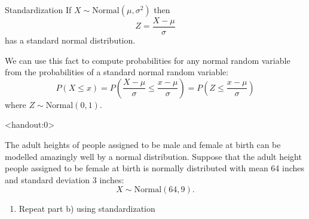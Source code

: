 \begin{frame}
  \begin{block}{Standardization}
    If $X \sim \mbox{Normal}(\mu,\sigma^2)$ then
    \[
      Z=\frac{X-\mu}{\sigma}
    \]
    has a standard normal distribution.

    \bigskip

    \pause
    
    We can use this fact to compute probabilities for any normal random variable from the probabilities of a standard normal random variable:
    \[
      P(X \leq x)
      =P\left(\frac{X-\mu}{\sigma} \leq \frac{x-\mu}{\sigma}\right)
      =P\left(Z \leq \frac{x-\mu}{\sigma}\right)
    \]
    where $Z \sim \mbox{Normal}(0,1)$. 
  \end{block}
\end{frame}

\begin{frame}<handout:0>
  \begin{block}{\examplectd}
    The adult heights of people assigned to be male and female at birth can be modelled amazingly well by a normal distribution. Suppose that the adult height people assigned to be female at birth is normally distributed with mean 64 inches and standard deviation 3 inches:
    \[
      X \sim \mbox{Normal}(64,9).
    \]
    
    \begin{enumerate}[label=\alph*),start=4]
    \item Repeat part b) using standardization
    \end{enumerate}
  \end{block}
\end{frame}


